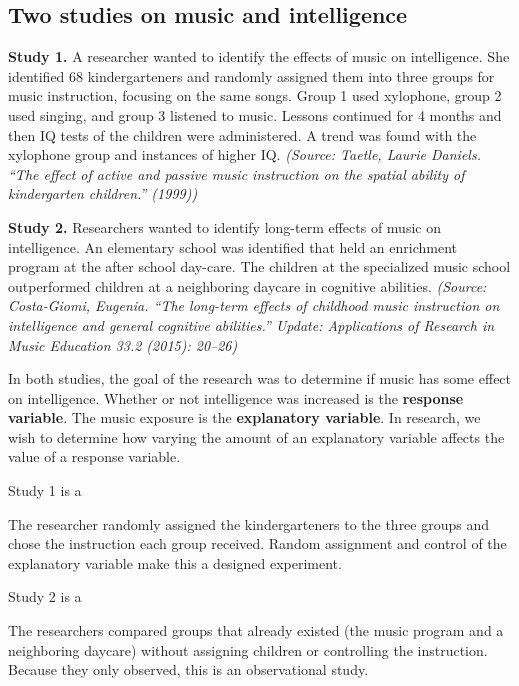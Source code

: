 \documentclass{ximera}
\begin{document}
\subsection*{Two studies on music and intelligence}

\textbf{Study 1.} A researcher wanted to identify the effects of music on intelligence. She identified 68 kindergarteners and randomly assigned them into three groups for music instruction, focusing on the same songs. Group 1 used xylophone, group 2 used singing, and group 3 listened to music. Lessons continued for 4 months and then IQ tests of the children were administered. A trend was found with the xylophone group and instances of higher IQ. \emph{(Source: Taetle, Laurie Daniels. ``The effect of active and passive music instruction on the spatial ability of kindergarten children.'' (1999))}

\textbf{Study 2.} Researchers wanted to identify long-term effects of music on intelligence. An elementary school was identified that held an enrichment program at the after school day-care. The children at the specialized music school outperformed children at a neighboring daycare in cognitive abilities. \emph{(Source: Costa-Giomi, Eugenia. ``The long-term effects of childhood music instruction on intelligence and general cognitive abilities.'' Update: Applications of Research in Music Education 33.2 (2015): 20--26)}

In both studies, the goal of the research was to determine if music has some effect on intelligence. Whether or not intelligence was increased is the \textbf{response variable}. The music exposure is the \textbf{explanatory variable}. In research, we wish to determine how varying the amount of an explanatory variable affects the value of a response variable.

\begin{problem}
\begin{question}
Study 1 is a
\begin{multipleChoice}
\end{multipleChoice}
\begin{explanation}
The researcher randomly assigned the kindergarteners to the three groups and chose the instruction each group received. Random assignment and control of the explanatory variable make this a designed experiment.
\end{explanation}
\end{question}
\begin{question}
Study 2 is a
\begin{multipleChoice}
\end{multipleChoice}
\begin{explanation}
The researchers compared groups that already existed (the music program and a neighboring daycare) without assigning children or controlling the instruction. Because they only observed, this is an observational study.
\end{explanation}
\end{question}
\end{problem}
\end{document}
